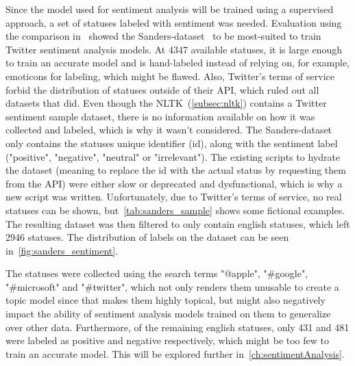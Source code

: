 Since the model used for sentiment analysis will be trained using a supervised approach,
a set of statuses labeled with sentiment was needed.
Evaluation using the comparison in~\cite{Saif2013} showed the Sanders-dataset~\cite{sanders} to be most-suited to train Twitter sentiment analysis models.
At 4347 available statuses, it is large enough to train an accurate model and is hand-labeled instead of relying on, for example, emoticons for labeling, which might be flawed.
Also, Twitter's terms of service forbid the distribution of statuses outside of their API, which ruled out all datasets that did.
Even though the NLTK~(\cref{subsec:nltk}) contains a Twitter sentiment sample dataset,
there is no information available on how it was collected and labeled, which is why it wasn't considered.
The Sanders-dataset only contains the statuses unique identifier (id), along with the sentiment label ("positive", "negative", "neutral" or "irrelevant").
The existing scripts to hydrate the dataset (meaning to replace the id with the actual status by requesting them from the API) were either slow or deprecated and dysfunctional,
which is why a new script was written.
Unfortunately, due to Twitter's terms of service, no real statuses can be shown, but~\cref{tab:sanders_sample} shows some fictional examples.
The resulting dataset was then filtered to only contain english statuses, which left 2946 statuses.
The distribution of labels on the dataset can be seen in~\cref{fig:sanders_sentiment}.

The statuses were collected using the search terms "@apple", "\#google", "\#microsoft" and "\#twitter",
which not only renders them unusable to create a topic model since that makes them highly topical,
but might also negatively impact the ability of sentiment analysis models trained on them to generalize over other data.
Furthermore, of the remaining english statuses, only 431 and 481 were labeled as positive and negative respectively,
which might be too few to train an accurate model.
This will be explored further in~\cref{ch:sentimentAnalysis}.

